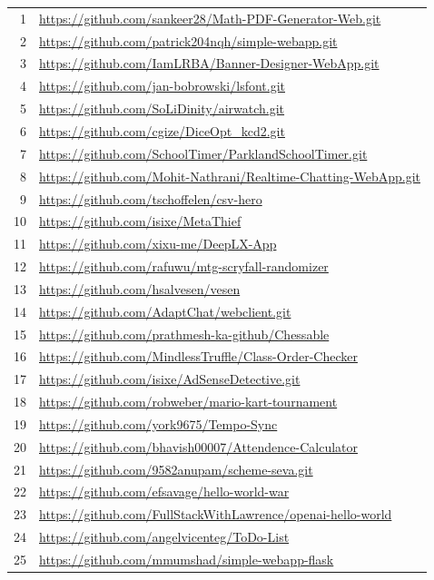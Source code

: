 \documentclass[
    bindingoffset=5mm,  %
    footnoteindent=3mm, %
    hyphenation=true    %
]{src/wut-thesis}
\begin{document}
\begin{tabular}{r l}
1 & \url{https://github.com/sankeer28/Math-PDF-Generator-Web.git} \\
2 & \url{https://github.com/patrick204nqh/simple-webapp.git} \\
3 & \url{https://github.com/IamLRBA/Banner-Designer-WebApp.git} \\
4 & \url{https://github.com/jan-bobrowski/lsfont.git} \\
5 & \url{https://github.com/SoLiDinity/airwatch.git} \\
6 & \url{https://github.com/cgize/DiceOpt_kcd2.git} \\
7 & \url{https://github.com/SchoolTimer/ParklandSchoolTimer.git} \\
8 & \url{https://github.com/Mohit-Nathrani/Realtime-Chatting-WebApp.git} \\
9 & \url{https://github.com/tschoffelen/csv-hero} \\
10 & \url{https://github.com/isixe/MetaThief} \\
11 & \url{https://github.com/xixu-me/DeepLX-App} \\
12 & \url{https://github.com/rafuwu/mtg-scryfall-randomizer} \\
13 & \url{https://github.com/hsalvesen/vesen} \\
14 & \url{https://github.com/AdaptChat/webclient.git} \\
15 & \url{https://github.com/prathmesh-ka-github/Chessable} \\
16 & \url{https://github.com/MindlessTruffle/Class-Order-Checker} \\
17 & \url{https://github.com/isixe/AdSenseDetective.git} \\
18 & \url{https://github.com/robweber/mario-kart-tournament} \\
19 & \url{https://github.com/york9675/Tempo-Sync} \\
20 & \url{https://github.com/bhavish00007/Attendence-Calculator} \\
21 & \url{https://github.com/9582anupam/scheme-seva.git} \\
22 & \url{https://github.com/efsavage/hello-world-war} \\
23 & \url{https://github.com/FullStackWithLawrence/openai-hello-world} \\
24 & \url{https://github.com/angelvicenteg/ToDo-List} \\
25 & \url{https://github.com/mmumshad/simple-webapp-flask} \\
\end{tabular}
\end{document}
